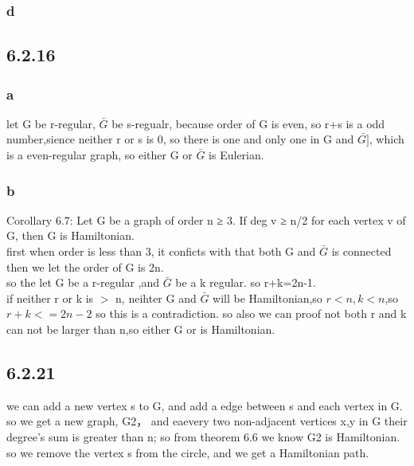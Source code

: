 \documentclass[a4paper,UTF8]{article}
\theoremstyle{definition}
\begin{document}
\subsubsection*{d}

\subsection*{6.2.16}
\subsubsection*{a}

let G be r-regular, $\bar{G}$ be s-regualr,
because order of G is even, so r+s is a odd number,sience
neither r or s is 0, so there is one and only one in G and $\bar{G]}$, which is a even-regular graph,
so either G or $\bar{G}$ is Eulerian.
 \subsubsection*{b}
Corollary 6.7: Let G be a graph of order n ≥ 3. If deg v ≥ n/2 for each vertex v of G, then G is
Hamiltonian.\\
first when order is less than 3, it conficts with that both G and $\bar{G}$ is connected\\
then we let the order of G is 2n.\\
so the let G be a r-regular ,and $\bar{G}$ be a k regular.
so r+k=2n-1.\\
if neither r or k is $\gt$ n, neihter G and $\bar{G}$ will be Hamiltonian,so $r<n,k<n$,so $r+k<=2n-2$
so this is a contradiction.
so also we can proof not both r and k can not be larger  than n,so either G or is Hamiltonian.


\subsection*{6.2.21}
we can add a new vertex  s to G, and add a edge between s and each vertex in G.
so we get a new graph, G2， and eaevery two non-adjacent vertices x,y in G their degree's sum is greater than n;
so from theorem 6.6 we know G2 is Hamiltonian. so we remove the vertex s from the circle, and we get a Hamiltonian path.
\end{document}
